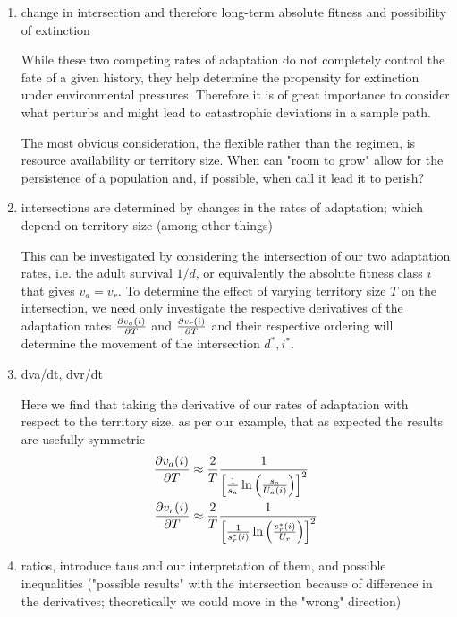 \documentclass[9pt,twocolumn,twoside]{article}
\begin{document}
\begin{enumerate}
    \item change in intersection and therefore long-term absolute fitness and possibility of extinction
    
    While these two competing rates of adaptation do not completely control the fate of a given history, they help determine the propensity for extinction under environmental pressures. Therefore it is of great importance to consider what perturbs and might lead to catastrophic deviations in a sample path.
    
    The most obvious consideration, the flexible rather than the regimen, is resource availability or territory size. When can "room to grow" allow for the persistence of a population and, if possible, when call it lead it to perish?
    
    \item intersections are determined by changes in the rates of adaptation; which depend on territory size (among other things)
    
    This can be investigated by considering the intersection of our two adaptation rates, i.e. the adult survival $1/d$, or equivalently the absolute fitness class $i$ that gives $v_a = v_r$. To determine the effect of varying territory size $T$ on the intersection, we need only investigate the respective derivatives of the adaptation rates $\pdv{v_{a}(i)}{T}$ and $\pdv{v_{r}(i)}{T}$ and their respective ordering will determine the movement of the intersection $d^{*},i^{*}$. 
    

    \item dva/dt, dvr/dt
    
    
Here we find that taking the derivative of our rates of adaptation with respect to the territory size, as per our example, that as expected the results are usefully symmetric
\begin{align*}
    \pdv{v_{a}(i)}{T} & \approx \frac{2}{T}  \frac{1}{ \left [ \frac{1}{s_{a}}\ln  \left ( \frac{s_{a}}{U_{a}(i)} \right ) \right ]^2} \\
    \pdv{v_{r}(i)}{T} & \approx \frac{2}{T}  \frac{1}{ \left [ \frac{1}{s_{r}^{*}(i)} \ln \left(\frac{s_{r}^{*}(i)}{U_{r}}\right) \right ]^2}
\end{align*}


    \item ratios, introduce taus and our interpretation of them, and possible inequalities ("possible results" with the intersection because of difference in the derivatives; theoretically we could move in the "wrong" direction)
    

\end{enumerate}
\end{document}
